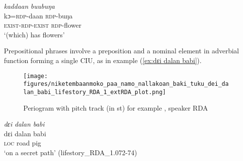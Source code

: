 

{
	\ex
	\label{ex:kaddaan buubunga}
	\textit{kaddaan buubuŋa} \\
	\gll  kɔ=\textsc{rdp}-daan \textsc{rdp}-buŋa \\
	\textsc{exist}-\textsc{rdp}-\textsc{exist} \textsc{rdp}-flower \\
	\glt `(which) has flowers'
	\hfill
}
\z
\z



Prepositional phrases  involve a preposition and a nominal element in adverbial function forming a single CIU, as in example  (\ref{ex:dɛi dalan babi}). 

\begin{figure}
	\texttt{[image: figures/niketembaanmoko\_paa\_namo\_nallakoan\_baki\_tuku\_dei\_dalan\_babi\_lifestory\_RDA\_1\_extRDA\_plot.png]}
	\caption{Periogram with pitch track (in st) for example , speaker RDA}
	\label{pitch:namo nallakoan baki tuku}
\end{figure}



\ea
\label{ex:PP}




{
	\ex
	\label{ex:dɛi dalan babi}
	\textit{dɛi dalan babi} \\
	\gll  dɛi dalan babi \\
	\textsc{loc} road pig \\
	\glt `on a secret path'
	\hfill(lifestory\_RDA\_1.072-74) 
}
\z
\z

